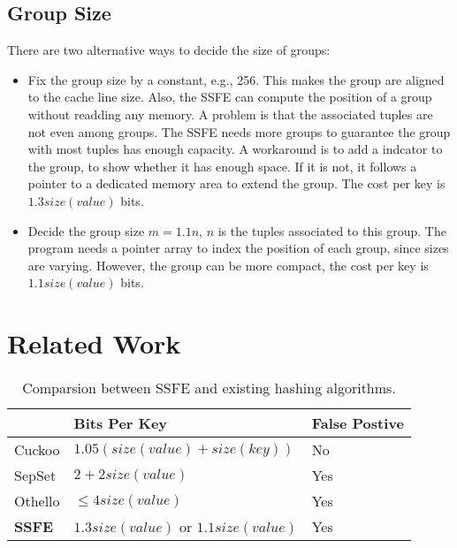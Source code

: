 \documentclass{article}
\begin{document}
\subsection{Group Size}

There are two alternative ways to decide the size of groups:

\begin{itemize}
    \item Fix the group size by a constant, e.g., 256. This makes the group are aligned to the cache line size. Also, the SSFE can compute the position of a group without readding any memory. A problem is that the associated tuples are not even among groups. The SSFE needs more groups to guarantee the group with most tuples has enough capacity. A workaround is to add a indcator to the group, to show whether it has enough space. If it is not, it follows a pointer to a dedicated memory area to extend the group. The cost per key is $1.3 size(value)$ bits.
    \item Decide the group size $m = 1.1n$, $n$ is the tuples associated to this group. The program needs a pointer array to index the position of each group, since sizes are varying. However, the group can be more compact, the cost per key is $1.1 size(value)$ bits.
\end{itemize}

\section{Related Work}
\label{sec:related_work}

\begin{table}[]
    \centering
    \begin{tabular}{lll}
        \hline
                  & Bits Per Key                     & False Postive \\ \hline\hline
    Cuckoo        & $1.05 (size(value) + size(key))$ & No            \\ \hline
    SepSet        & $2 + 2 size(value)$              & Yes           \\ \hline
    Othello       & $\le 4 size(value)$              & Yes           \\ \hline
    \textbf{SSFE} & $1.3 size(value)$  or $1.1 size(value)$ & Yes     
    \\ \hline
    \end{tabular}
    \caption{Comparsion between SSFE and existing hashing algorithms.}
    \label{tab:comparsion}
\end{table}
\end{document}
